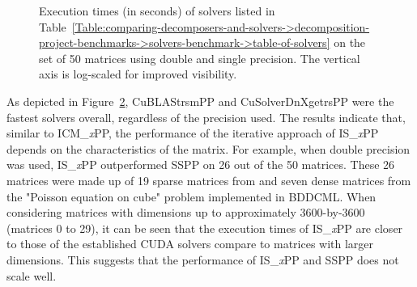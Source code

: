 \begin{figure}[ht!]
\begin{subfigure}{\textwidth}
		\label{Figure:comparing-decomposers-and-solvers->decomposition-project-benchmarks->solvers-benchmark->comparison-of-execution-times-on-all-matrices->single-precision}
	\end{subfigure}
	\caption{Execution times (in seconds) of solvers listed in Table~\ref{Table:comparing-decomposers-and-solvers->decomposition-project-benchmarks->solvers-benchmark->table-of-solvers} on the set of 50 matrices using double and single precision. The vertical axis is log-scaled for improved visibility.}
	\label{Figure:comparing-decomposers-and-solvers->decomposition-project-benchmarks->solvers-benchmark->comparison-of-execution-times-on-all-matrices->double-and-single-precision}
\end{figure}

As depicted in Figure~\ref{Figure:comparing-decomposers-and-solvers->decomposition-project-benchmarks->solvers-benchmark->comparison-of-execution-times-on-all-matrices->double-and-single-precision}, CuBLAStrsmPP and CuSolverDnXgetrsPP were the fastest solvers overall, regardless of the precision used. The results indicate that, similar to ICM\_\textit{x}PP, the performance of the iterative approach of IS\_\textit{x}PP depends on the characteristics of the matrix. For example, when double precision was used, IS\_\textit{x}PP outperformed SSPP on 26 out of the 50 matrices. These 26 matrices were made up of 19 sparse matrices from  \cite{Davis2011} and seven dense matrices from the "Poisson equation on cube" problem implemented in BDDCML. When considering matrices with dimensions up to approximately 3600-by-3600 (matrices 0 to 29), it can be seen that the execution times of IS\_\textit{x}PP are closer to those of the established CUDA solvers compare to matrices with larger dimensions. This suggests that the performance of IS\_\textit{x}PP and SSPP does not scale well.

